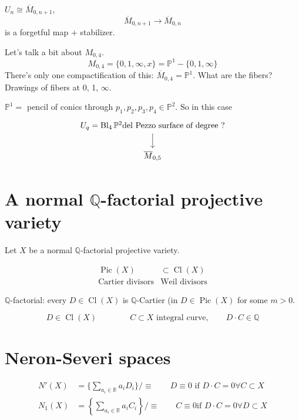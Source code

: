  \begin{lemma}
 	$U_n\cong \overline{M}_{0,n+1}$,
	\[\overline{M}_{0,n+1}\longrightarrow \overline{M}_{0,n}\]
	is a forgetful map + stabilizer.
 \end{lemma}
Let's talk a bit about $M_{0,4}$.
 \[M_{0,4}=\{0,1,\infty,x\} =\mathbb{P}^1-\{0,1,\infty\}\]
 There's only one compactification of this: $\overline{M}_{0,4}=\mathbb{P}^1$. What are the fibers? Drawings of fibers at 0, 1, $\infty$.

 $\mathbb{P}^ 1=$ pencil of conics through $p_1,p_2,p_3,p_4\in\mathbb{P}^2$. So in this case
 \[\begin{tikzcd}
 U_q=\operatorname{Bl}_{4}\mathbb{P}^2\text{del Pezzo surface of degree ?} \arrow[d]\\
 \overline{M}_{0,5}
 \end{tikzcd}\]

\section{A normal $\mathbb{Q}$-factorial projective variety}

Let $X$ be a normal $\mathbb{Q}$-factorial projective variety.

\begin{align*}
\operatorname{Pic}(X)	&\subset \operatorname{Cl}(X)\\
\text{Cartier divisors} &\text{Weil divisors} 
\end{align*}

\begin{defn}
	$\mathbb{Q}$-factorial: every $D\in\operatorname{Cl}(X)$ is $\mathbb{Q}$-Cartier (in $D\in\operatorname{Pic}(X)$ for some $m>0$.

	 \[D\in\operatorname{Cl}(X)\qquad \qquad C\subset X\text{ integral curve}, \qquad D\cdot C\in\mathbb{Q} \]

\end{defn}
\section{Neron-Severi spaces}

\begin{align*}
	N'(X)&=\{\sum_{a_i\in\mathbb{R}}a_iD_i\} /\equiv\qquad D\equiv 0 \text{ if } D\cdot C=0\forall C\subset X\\
	N_1(X)&=\left\{ \sum_{a_i\in\mathbb{R}}a_iC_i \right\}/\equiv\qquad C\equiv 0\text{if }D\cdot C=0\forall D\subset X 
\end{align*}

